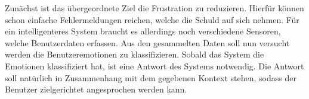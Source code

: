 Zunächst ist das übergeordnete Ziel die Frustration zu reduzieren. Hierfür können schon einfache Fehlermeldungen reichen, welche die Schuld auf sich nehmen. Für ein intelligenteres System braucht es allerdings noch verschiedene Sensoren, welche Benutzerdaten erfassen. Aus den gesammelten Daten soll nun versucht werden die Benutzeremotionen zu klassifizieren. Sobald das System die Emotionen klassifiziert hat, ist eine Antwort des Systems notwendig. Die Antwort soll natürlich in Zusammenhang mit dem gegebenen Kontext stehen, sodass der Benutzer zielgerichtet angesprochen werden kann.

